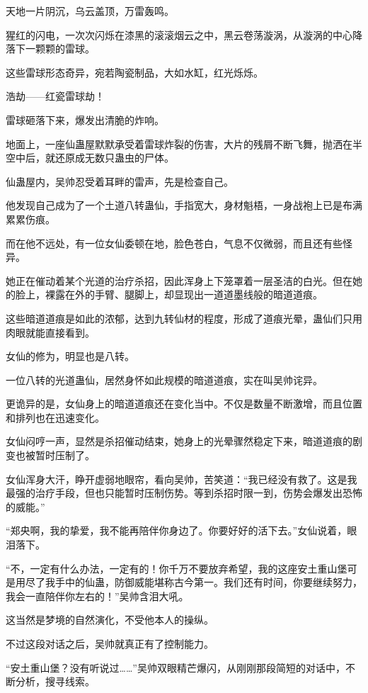 
\begin{this_body}

天地一片阴沉，乌云盖顶，万雷轰鸣。

猩红的闪电，一次次闪烁在漆黑的滚滚烟云之中，黑云卷荡漩涡，从漩涡的中心降落下一颗颗的雷球。

这些雷球形态奇异，宛若陶瓷制品，大如水缸，红光烁烁。

浩劫——红瓷雷球劫！

雷球砸落下来，爆发出清脆的炸响。

地面上，一座仙蛊屋默默承受着雷球炸裂的伤害，大片的残屑不断飞舞，抛洒在半空中后，就还原成无数只蛊虫的尸体。

仙蛊屋内，吴帅忍受着耳畔的雷声，先是检查自己。

他发现自己成为了一个土道八转蛊仙，手指宽大，身材魁梧，一身战袍上已是布满累累伤痕。

而在他不远处，有一位女仙委顿在地，脸色苍白，气息不仅微弱，而且还有些怪异。

她正在催动着某个光道的治疗杀招，因此浑身上下笼罩着一层圣洁的白光。但在她的脸上，裸露在外的手臂、腿脚上，却显现出一道道墨线般的暗道道痕。

这些暗道道痕是如此的浓郁，达到九转仙材的程度，形成了道痕光晕，蛊仙们只用肉眼就能直接看到。

女仙的修为，明显也是八转。

一位八转的光道蛊仙，居然身怀如此规模的暗道道痕，实在叫吴帅诧异。

更诡异的是，女仙身上的暗道道痕还在变化当中。不仅是数量不断激增，而且位置和排列也在迅速变化。

女仙闷哼一声，显然是杀招催动结束，她身上的光晕骤然稳定下来，暗道道痕的剧变也被暂时压制了。

女仙浑身大汗，睁开虚弱地眼帘，看向吴帅，苦笑道：“我已经没有救了。这是我最强的治疗手段，但也只能暂时压制伤势。等到杀招时限一到，伤势会爆发出恐怖的威能。”

“郑央啊，我的挚爱，我不能再陪伴你身边了。你要好好的活下去。”女仙说着，眼泪落下。

“不，一定有什么办法，一定有的！你千万不要放弃希望，我的这座安土重山堡可是用尽了我手中的仙蛊，防御威能堪称古今第一。我们还有时间，你要继续努力，我会一直陪伴你左右的！”吴帅含泪大吼。

这当然是梦境的自然演化，不受他本人的操纵。

不过这段对话之后，吴帅就真正有了控制能力。

“安土重山堡？没有听说过……”吴帅双眼精芒爆闪，从刚刚那段简短的对话中，不断分析，搜寻线索。


\end{this_body}

